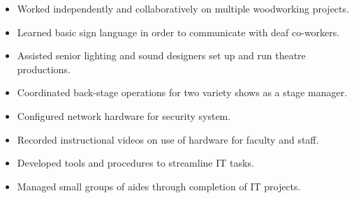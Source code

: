 \documentclass[10pt,a4paper,ragged2e,withhyper]{altacv}
\begin{document}
\divider{}

\begin{itemize}
\item Worked independently and collaboratively on multiple woodworking projects.
\item Learned basic sign language in order to communicate with deaf co-workers.
\item Assisted senior lighting and sound designers set up and run theatre productions.
\item Coordinated back-stage operations for two variety shows as a stage manager.
\end{itemize}

\divider{}

\begin{itemize}
\item Configured network hardware for security system.
\item Recorded instructional videos on use of hardware for faculty and staff.
\item Developed tools and procedures to streamline IT tasks.
\item Managed small groups of aides through completion of IT projects.
\end{itemize}




















\end{document}
